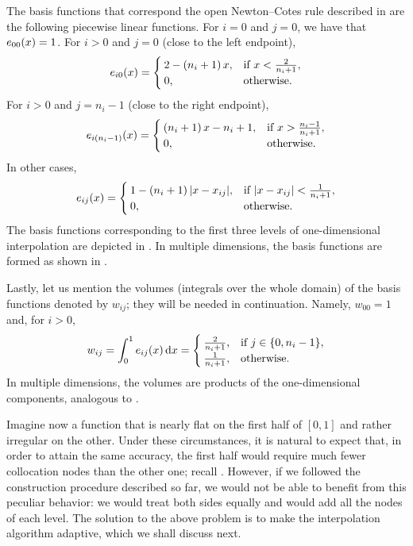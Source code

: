 The basis functions that correspond the open Newton--Cotes rule described in
 are the following piecewise linear functions. For $i = 0$ and $j =
0$, we have that $e_{00}(x) = 1$. For $i > 0$ and $j = 0$ (close to the left
endpoint),
\[
  e_{i0}(x) =
  \begin{cases}
    2 - \left( n_i + 1 \right) x, & \text{if } x < \frac{2}{n_i + 1}, \\
    0, & \text{otherwise}.
  \end{cases}
\]
For $i > 0$ and $j = n_i - 1$ (close to the right endpoint),
\[
  e_{i(n_i - 1)}(x) =
  \begin{cases}
    \left( n_i + 1 \right) x - n_i + 1, & \text{if } x > \frac{n_i - 1}{n_i + 1}, \\
    0, & \text{otherwise}.
  \end{cases}
\]
In other cases,
\[
  e_{ij}(x) =
  \begin{cases}
    1 - \left( n_i + 1 \right)|x - x_{ij}|, & \text{if } |x - x_{ij}| < \frac{1}{n_i + 1}, \\
    0, & \text{otherwise}.
  \end{cases}
\]
The basis functions corresponding to the first three levels of one-dimensional
interpolation are depicted in . In multiple dimensions, the basis
functions are formed as shown in .

Lastly, let us mention the volumes (integrals over the whole domain) of the
basis functions denoted by $w_{ij}$; they will be needed in continuation.
Namely, $w_{00} = 1$ and, for $i > 0$,
\[
  w_{ij} = \int_0^1 e_{ij}(x) \, \mathrm{d} x =
  \begin{cases}
    \frac{2}{n_i + 1}, & \text{if } j \in \{ 0, n_i - 1 \}, \\
    \frac{1}{n_i + 1}, & \text{otherwise}.
  \end{cases}
\]
In multiple dimensions, the volumes are products of the one-dimensional
components, analogous to .

Imagine now a function that is nearly flat on the first half of $[0, 1]$ and
rather irregular on the other. Under these circumstances, it is natural to
expect that, in order to attain the same accuracy, the first half would require
much fewer collocation nodes than the other one; recall .
However, if we followed the construction procedure described so far, we would
not be able to benefit from this peculiar behavior: we would treat both sides
equally and would add all the nodes of each level. The solution to the above
problem is to make the interpolation algorithm adaptive, which we shall discuss
next.

